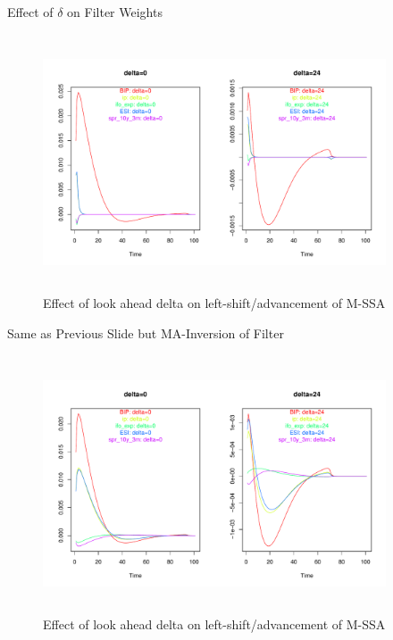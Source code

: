 \documentclass{beamer}
\begin{document}
\begin{frame} {Effect of $\delta$ on Filter Weights}
\begin{figure}[H]\begin{center}\includegraphics[height=3in, width=4in]{look_ahead_ssa_6.pdf}\caption{Effect of look ahead delta on  left-shift/advancement of M-SSA\label{cor}}\end{center}\end{figure}\end{frame}


\begin{frame} {Same as Previous Slide but MA-Inversion of Filter}
\begin{figure}[H]\begin{center}\includegraphics[height=3in, width=4in]{look_ahead_ssa_7.pdf}\caption{Effect of look ahead delta on  left-shift/advancement of M-SSA\label{cor}}\end{center}\end{figure}\end{frame}
\end{document}
